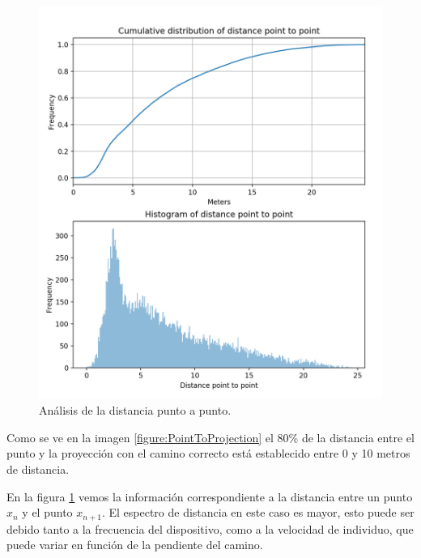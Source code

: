 \begin{figure}[!htb]
\begin{minipage}{0.48\textwidth}
\centering
\includegraphics[width=1.2\textwidth]{./Imagenes/PointToPoint.png}
\caption{Análisis de la distancia punto a punto.}
\label{figure:PointToPoint}
\end{minipage}
\end{figure}
\pagebreak

Como se ve en la imagen \ref{figure:PointToProjection} el 80\% de la distancia entre el 
punto y la proyección con el camino correcto está establecido entre 0 y 10 metros de 
distancia.

En la figura \ref{figure:PointToPoint} vemos la información correspondiente a la 
distancia entre un punto $x_{n}$ y el punto $x_{n+1}$. El espectro de distancia en este 
caso es mayor, esto puede  ser debido  tanto a la frecuencia del dispositivo, como a la 
velocidad de individuo, que puede variar en función de la pendiente del camino.